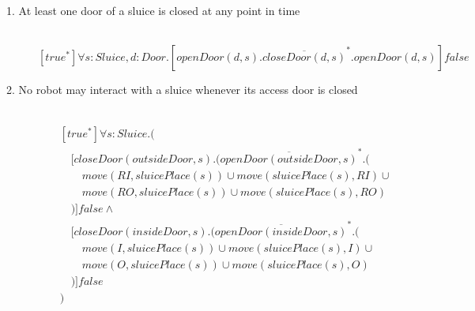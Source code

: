 
\newcommand{\tab}{\hspace{1em}}

\begin{description}
 \item[1. At least one door of a sluice is closed at any point in time]\mbox{}\\
\[
[true^*]\forall s:Sluice,d:Door.[openDoor(d, s).\overline{closeDoor(d, s)}^*.openDoor(d, s)]false
\]


 \item[2. No robot may interact with a sluice whenever its access door is closed]\mbox{}\\
\begin{align*}
& [true^*]\forall s:Sluice.( \\
& \tab [closeDoor(outsideDoor, s).(\overline{openDoor(outsideDoor, s)}^*.( \\
& \tab\tab move(RI, sluicePlace(s)) \cup move(sluicePlace(s), RI) \cup \\
& \tab\tab move(RO, sluicePlace(s)) \cup move(sluicePlace(s), RO) \\
& \tab )]false \wedge \\
& \tab [closeDoor(insideDoor, s).(\overline{openDoor(insideDoor, s)}^*.( \\
& \tab\tab move(I, sluicePlace(s)) \cup move(sluicePlace(s), I) \cup \\
& \tab\tab move(O, sluicePlace(s)) \cup move(sluicePlace(s), O) \\
& \tab )]false \\
& )
\end{align*}
 
 \item[]


\end{description}
